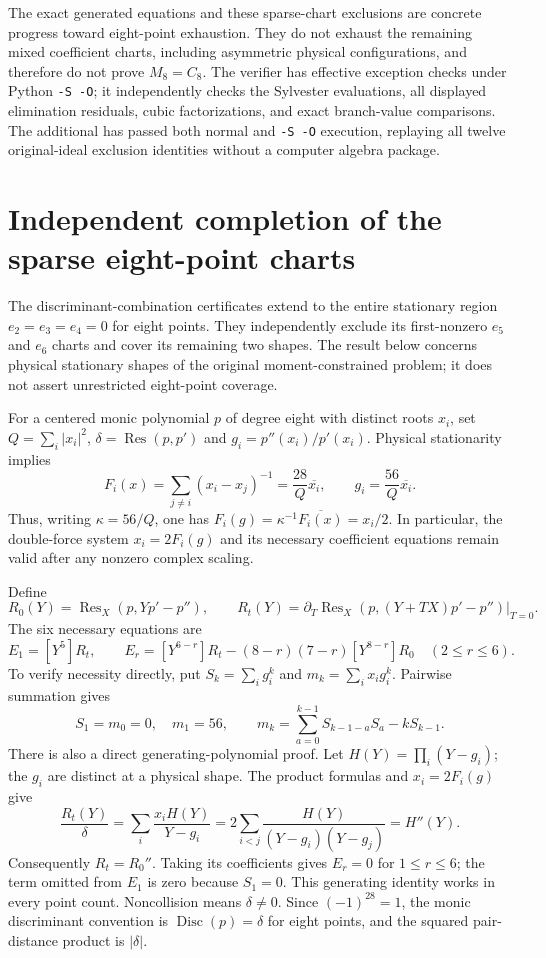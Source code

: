 \documentclass[11pt]{article}
\theoremstyle{remark}
\numberwithin{equation}{section}
\begin{document}
The exact generated equations and these sparse-chart exclusions are
concrete progress toward eight-point exhaustion. They do not exhaust
the remaining mixed coefficient charts, including asymmetric physical
configurations, and therefore do not prove $M_8=C_8$.
The verifier  has effective exception
checks under Python \texttt{-S -O}; it independently checks the
Sylvester evaluations, all displayed elimination residuals, cubic
factorizations, and exact branch-value comparisons. The additional
 has passed both normal and
\texttt{-S -O} execution, replaying all twelve original-ideal
exclusion identities without a computer algebra package.

\section{Independent completion of the sparse eight-point charts}
\label{sec:eight-sparse-independent}

The discriminant-combination certificates extend to the entire stationary
region $e_2=e_3=e_4=0$ for eight points. They independently exclude its
first-nonzero $e_5$ and $e_6$ charts and cover its remaining two shapes.
The result below concerns physical stationary shapes of the original
moment-constrained problem; it does not assert unrestricted eight-point
coverage.

For a centered monic polynomial $p$ of degree eight with distinct roots
$x_i$, set $Q=\sum_i|x_i|^2$, $\delta=\operatorname{Res}(p,p')$ and
$g_i=p''(x_i)/p'(x_i)$. Physical stationarity implies
\[
 F_i(x)=\sum_{j\ne i}(x_i-x_j)^{-1}
 =\frac{28}{Q}\overline{x_i},\qquad
 g_i=\frac{56}{Q}\overline{x_i}.
\]
Thus, writing $\kappa=56/Q$, one has
$F_i(g)=\kappa^{-1}\overline{F_i(x)}=x_i/2$.
In particular, the double-force system $x_i=2F_i(g)$ and its necessary
coefficient equations remain valid after any nonzero complex scaling.

Define
\[
 R_0(Y)=\operatorname{Res}_X(p,Yp'-p''),\qquad
 R_t(Y)=\left.\partial_T\operatorname{Res}_X
 (p,(Y+TX)p'-p'')\right|_{T=0}.
\]
The six necessary equations are
\begin{equation}\label{eq:eight-sparse-E-definition}
 E_1=[Y^5]R_t,\qquad
 E_r=[Y^{6-r}]R_t-(8-r)(7-r)[Y^{8-r}]R_0
 \quad(2\le r\le6).
\end{equation}
To verify necessity directly, put $S_k=\sum_i g_i^k$ and
$m_k=\sum_i x_i g_i^k$. Pairwise summation gives
\[
 S_1=m_0=0,\quad m_1=56,\qquad
 m_k=\sum_{a=0}^{k-1}S_{k-1-a}S_a-kS_{k-1}.
\]
There is also a direct generating-polynomial proof. Let
$H(Y)=\prod_i(Y-g_i)$; the $g_i$ are distinct at a physical shape.
The product formulas and $x_i=2F_i(g)$ give
\[
 \frac{R_t(Y)}\delta
 =\sum_i\frac{x_iH(Y)}{Y-g_i}
 =2\sum_{i<j}\frac{H(Y)}{(Y-g_i)(Y-g_j)}
 =H''(Y).
\]
Consequently $R_t=R_0''$. Taking its coefficients gives
$E_r=0$ for $1\le r\le6$; the term omitted from $E_1$ is zero because
$S_1=0$. This generating identity works in every point count.
Noncollision means $\delta\ne0$. Since $(-1)^{28}=1$, the monic
discriminant convention is $\operatorname{Disc}(p)=\delta$ for eight
points, and the squared pair-distance product is $|\delta|$.
\end{document}
